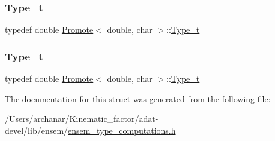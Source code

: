 \subsubsection{\texorpdfstring{Type\_t}{Type\_t}\hspace{0.1cm}{\footnotesize\ttfamily [2/3]}}
{\footnotesize\ttfamily typedef double \mbox{\hyperlink{structPromote}{Promote}}$<$ double, char $>$\+::\mbox{\hyperlink{structPromote_3_01double_00_01char_01_4_a9eda575d7d1de94d1933944cf245dc9f}{Type\+\_\+t}}}

\mbox{\label{structPromote_3_01double_00_01char_01_4_a9eda575d7d1de94d1933944cf245dc9f}} 
\subsubsection{\texorpdfstring{Type\_t}{Type\_t}\hspace{0.1cm}{\footnotesize\ttfamily [3/3]}}
{\footnotesize\ttfamily typedef double \mbox{\hyperlink{structPromote}{Promote}}$<$ double, char $>$\+::\mbox{\hyperlink{structPromote_3_01double_00_01char_01_4_a9eda575d7d1de94d1933944cf245dc9f}{Type\+\_\+t}}}



The documentation for this struct was generated from the following file\+:\begin{DoxyCompactItemize}
\item 
/\+Users/archanar/\+Kinematic\+\_\+factor/adat-\/devel/lib/ensem/\mbox{\hyperlink{adat-devel_2lib_2ensem_2ensem__type__computations_8h}{ensem\+\_\+type\+\_\+computations.\+h}}\end{DoxyCompactItemize}
